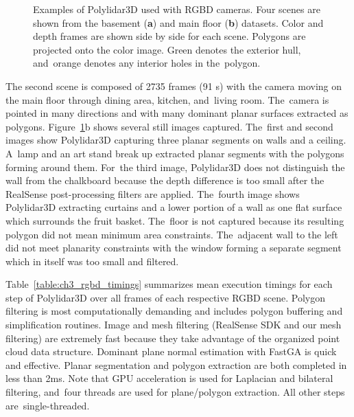 \begin{figure}[ht]
  \caption[Example of Polylidar3D used with \ac{RGBD} cameras]{Examples of Polylidar3D used with \ac{RGBD} cameras. Four scenes are shown from the basement (\textbf{a}) and main floor (\textbf{b}) datasets. Color and depth frames are shown side by side for each scene. Polygons are projected onto the color image. Green denotes the exterior hull, and~orange denotes any interior holes in the~polygon.}\label{fig:ch3_rgbd}
\end{figure}

The second scene is composed of 2735 frames (91 s) with the camera moving on the main floor through dining area, kitchen, and~living room. The~camera is pointed in many directions and with many dominant planar surfaces extracted as polygons. Figure~\ref{fig:ch3_rgbd}b shows several still images captured. The~first and second images show Polylidar3D capturing three planar segments on walls and a ceiling. A~lamp and an art stand break up extracted planar segments with the polygons forming around them. For~the third image, Polylidar3D does not distinguish the wall from the chalkboard because the depth difference is too small after the RealSense post-processing filters are applied.  The~fourth image shows Polylidar3D extracting curtains and a lower portion of a wall as one flat surface which surrounds the fruit basket. The~floor is not captured because its resulting polygon did not mean minimum area constraints. The~adjacent wall to the left did not meet planarity constraints with the window forming a separate segment which in itself was too small and filtered. 

Table~\ref{table:ch3_rgbd_timings} summarizes mean execution timings for each step of Polylidar3D over all frames of each respective \ac{RGBD} scene. Polygon filtering is most computationally demanding and includes polygon buffering and simplification routines.  Image and mesh filtering (RealSense SDK and our mesh filtering) are extremely fast because they take advantage of the organized point cloud data structure. Dominant plane normal estimation with FastGA is quick and effective. Planar segmentation and polygon extraction are both completed in less than 2ms. Note that \ac{GPU} acceleration is used for Laplacian and bilateral filtering, and~four threads are used for plane/polygon extraction. All other steps are~single-threaded.

